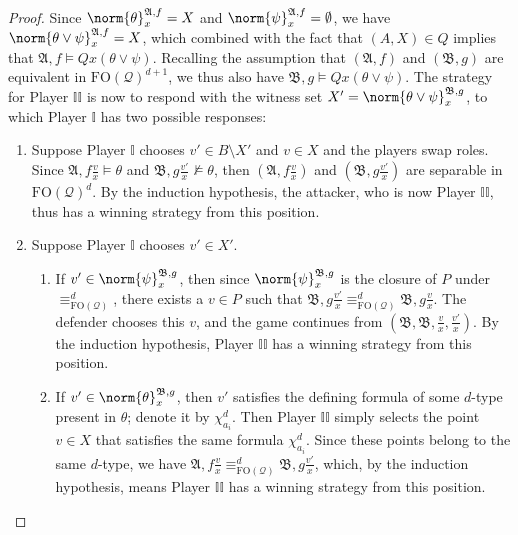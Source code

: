 \documentclass{article}
\theoremstyle{definition}
\begin{document}
\begin{proof}
    Since $\norm{\theta}^{\mathfrak{A},f}_x=X$ and $\norm{\psi}^{\mathfrak{A},f}_x=\emptyset$, we have $\norm{\theta\lor\psi}_x^{\mathfrak{A},f}=X$, which combined with the fact that $(A,X)\in Q$ implies that $\mathfrak{A},f\models Qx(\theta\lor \psi)$. Recalling the assumption that $(\mathfrak{A},f)$ and $(\mathfrak{B},g)$ are equivalent in $\mathrm{FO}(\mathcal{Q})^{d+1}$, we thus also have $\mathfrak{B},g\models Qx(\theta\lor\psi)$. The strategy for Player $\mathbb{II}$ is now to respond with the witness set $X'=\norm{\theta\lor\psi}_x^{\mathfrak{B},g}$, to which Player $\mathbb{I}$ has two possible responses:
    \begin{enumerate}
        \item Suppose Player $\mathbb{I}$ chooses $v'\in B\setminus X'$ and     $v\in X$ and the players swap roles. Since     $\mathfrak{A},f\frac{v}{x}\models\theta$ and     $\mathfrak{B},g\frac{v'}{x}\not\models\theta$, then     $(\mathfrak{A},f\frac{v}{x})$ and $(\mathfrak{B},g\frac{v'}{x})$     are separable in $\mathrm{FO}(\mathcal{Q})^d$. By the induction     hypothesis, the attacker, who is now Player $\mathbb{II}$, thus has     a winning strategy from this position.
        \item Suppose Player $\mathbb I$ chooses $v'\in X'$.
        \begin{enumerate}
            \item If $v'\in\norm{\psi}^{\mathfrak{B},g}_x$, then since $\norm{\psi}^{\mathfrak{B},g}_x$ is the closure of $P$ under $\equiv^d_{\mathrm{FO}(\mathcal{Q})}$, there exists a $v\in P$ such that $\mathfrak{B},g\frac{v'}{x}\equiv^d_{\mathrm{FO}(\mathcal{Q})} \mathfrak{B},g\frac{v}{x}$. The defender chooses this $v$, and the game continues from $(\mathfrak{B},\mathfrak{B},\frac{v}{x},\frac{v'}{x})$. By the induction hypothesis, Player $\mathbb{II}$ has a winning strategy from this position.
            \item If $v'\in\norm{\theta}_x^{\mathfrak{B},g}$, then $v'$         satisfies the defining formula of some $d$-type present in         $\theta$; denote it by $\chi^d_{a_i}$. Then Player $\mathbb{II}$         simply selects the point $v\in X$ that satisfies the same         formula $\chi^d_{a_i}$. Since these points belong to the same         $d$-type, we have         $\mathfrak{A},f\frac{v}{x}\equiv^d_{\mathrm{FO}(\mathcal{Q})}         \mathfrak{B},g\frac{v'}{x}$, which, by the induction hypothesis,         means Player $\mathbb{II}$ has a winning strategy from this         position.\qedhere
        \end{enumerate}
    \end{enumerate}
\end{proof}
\end{document}
